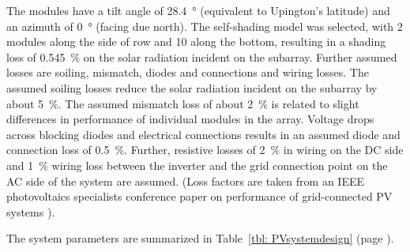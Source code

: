 
The modules have a tilt angle of \SI{28.4}{\degree} (equivalent to Upington's latitude) and an azimuth of \SI{0}{\degree} (facing due north). The self-shading model was selected, with \num{2} modules along the side of row and \num{10} along the bottom, resulting in a shading loss of \SI{0.545}{\percent} on the solar radiation incident on the subarray. Further assumed losses are soiling, mismatch, diodes and connections and wiring losses. The assumed soiling losses reduce the solar radiation incident on the subarray by about \SI{5}{\percent}. The assumed mismatch loss of about \SI{2}{\percent} is related to slight differences in performance of individual modules in the array. Voltage drops across blocking diodes and electrical connections results in an assumed diode and connection loss of \SI{0.5}{\percent}. Further, resistive losses of \SI{2}{\percent} in wiring on the DC side and \SI{1}{\percent} wiring loss between the inverter and the grid connection point on the AC side of the system are assumed. (Loss factors are taken from an IEEE photovoltaics specialists conference paper on performance of grid-connected PV systems \cite{Marion2005}).

The system parameters are summarized in Table~\ref{tbl: PVsystemdesign} (page \pageref{tbl: PVsystemdesign}).


